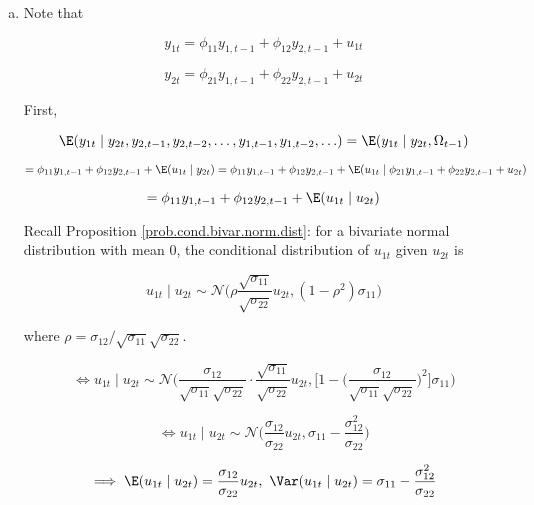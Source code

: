 \begin{enumerate}[(a)]

\item
 Note that 

\begin{equation}\label{ts.hw6.2.y1t}
y_{1t} = \phi_{11} y_{1,t-1} + \phi_{12} y_{2, t-1} + u_{1t}
\end{equation}

\begin{equation}\label{ts.hw6.2.y2t}
y_{2t} = \phi_{21} y_{1,t-1} + \phi_{22} y_{2, t-1} + u_{2t}
\end{equation}



First,

\[
\E(y_{1t} \mid y_{2t}, y_{2, t-1}, y_{2, t-2}, \ldots, y_{1, t-1}, y_{1, t-2}, \ldots) = \E(y_{1t} \mid y_{2t}, \Omega_{t-1}) 
\]

\[
= \phi_{11} y_{1,t-1} + \phi_{12} y_{2, t-1} + \E(u_{1t} \mid y_{2t})  =  \phi_{11} y_{1,t-1} + \phi_{12} y_{2, t-1} + \E(u_{1t} \mid \phi_{21} y_{1,t-1} + \phi_{22} y_{2, t-1} + u_{2t})
\]

\[
=  \phi_{11} y_{1,t-1} + \phi_{12} y_{2, t-1} + \E(u_{1t} \mid u_{2t})
\]

Recall Proposition \ref{prob.cond.bivar.norm.dist}: for a bivariate normal distribution with mean 0, the conditional distribution of \(u_{1t}\) given \(u_{2t}\) is

\[
u_{1t} \mid u_{2t} \sim \mathcal{N} \bigg(\rho \frac{\sqrt{\sigma_{11}}}{\sqrt{\sigma_{22}}}u_{2t}, (1 - \rho^2)\sigma_{11} \bigg) 
\]

where \(\rho = \sigma_{12}/\sqrt{\sigma_{11}}\sqrt{\sigma_{22}}\).

\[
\iff u_{1t} \mid u_{2t} \sim \mathcal{N} \bigg(\frac{\sigma_{12}}{\sqrt{\sigma_{11}}\sqrt{\sigma_{22}}} \cdot \frac{\sqrt{\sigma_{11}}}{\sqrt{\sigma_{22}}}u_{2t}, \bigg[1 - \bigg(\frac{\sigma_{12}}{\sqrt{\sigma_{11}}\sqrt{\sigma_{22}}} \bigg) ^2 \bigg]\sigma_{11} \bigg) 
\]

\[
\iff u_{1t} \mid u_{2t} \sim \mathcal{N} \bigg(\frac{\sigma_{12}}{\sigma_{22}} u_{2t}, \sigma_{11} - \frac{\sigma_{12}^2}{\sigma_{22}}  \bigg) 
\]

\[
\implies  \E(u_{1t} \mid u_{2t}) = \frac{\sigma_{12}}{\sigma_{22}} u_{2t}, \ \Var(u_{1t} \mid u_{2t}) = \sigma_{11} - \frac{\sigma_{12}^2}{\sigma_{22}}
\]


\end{enumerate}

